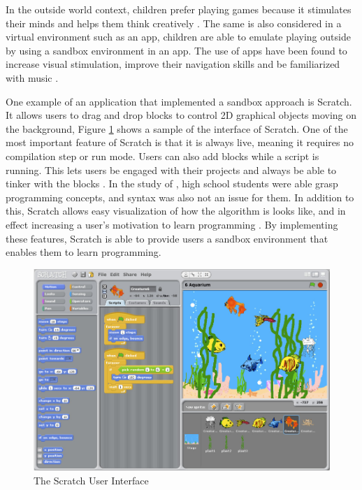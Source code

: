 In the outside world context, children prefer playing games because it stimulates their minds and helps them think creatively \cite{martin1999social, inal2007flow}. The same is also considered in a virtual environment such as an app, children are able to emulate playing outside by using a sandbox environment in an app. The use of apps have been found to increase visual stimulation, improve their navigation skills and be familiarized with music \cite{burton2016music}.

One example of an application that implemented a sandbox approach is Scratch. It allows users to drag and drop blocks to control 2D graphical objects moving on the background, Figure \ref{fig:Scratch_User_Interface} shows a sample of the interface of Scratch. One of the most important feature of Scratch is that it is always live, meaning it requires no compilation step or run mode. Users can also add blocks while a script is running. This lets users be engaged with their projects and always be able to tinker with the blocks \cite{maloney2010scratch}. In the study of , high school students were able grasp programming concepts, and syntax was also not an issue for them. In addition to this, Scratch allows easy visualization of how the algorithm is looks like, and in effect increasing a user’s motivation to learn programming \cite{erol2017effects}. By implementing these features, Scratch is able to provide users a sandbox environment that enables them to learn programming. 

\newpage

\begin{figure}[H]
    \centering
    \includegraphics[width=12cm]{figures/Scratch_UI.png}
    \caption{The Scratch User Interface \protect\cite{maloney2010scratch}}
    \label{fig:Scratch_User_Interface}
\end{figure}

